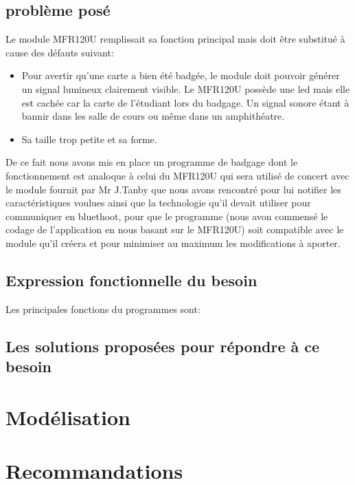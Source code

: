     \subsection{problème posé}
    Le module MFR120U remplissait sa fonction principal mais doit être substitué 
    à cause des défauts suivant:

    \begin{itemize}
    \item Pour avertir qu'une carte a bien été badgée, le module doit pouvoir générer 
    un signal lumineux clairement visible. Le MFR120U possède une led mais elle 
    est cachée car la carte de l'étudiant lors du badgage. Un signal sonore étant
    à bannir dans les salle de cours ou même dans un amphithéatre.
    \item Sa taille trop petite et sa forme.
    \end{itemize}

    De ce fait nous avons mis en place un programme de badgage dont le fonctionnement
    est analoque à celui du MFR120U qui sera utilisé de concert avec le module fournit
    par Mr J.Tanby que nous avons rencontré pour lui notifier les caractéristiques
    voulues ainsi que la technologie qu'il devait utiliser pour communiquer en 
    bluethoot, pour que le programme (nous avon commensé le codage de l'application
    en nous basant sur le MFR120U) soit compatible avec le module qu'il créera et 
    pour minimiser au maximum les modifications à aporter.


    \subsection{Expression fonctionnelle du besoin}
        Les principales fonctions du programmes sont:


    \subsection{Les solutions proposées pour répondre à ce besoin}


\section{Modélisation}
\section{Recommandations}
